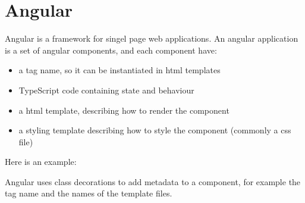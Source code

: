 
\chapter{Angular} \label{chapter:angular}

Angular is a framework for singel page web applications. An angular application is a set of angular components, and each component have:
\begin{itemize}
\item a tag name, so it can be instantiated in html templates
\item TypeScript code containing state and behaviour
\item a html template, describing how to render the component
\item a styling template describing how to style the component (commonly a css file)
\end{itemize}
Here is an example:
Angular uses class decorations to add metadata to a component, for example the tag name and the names of the template files.

